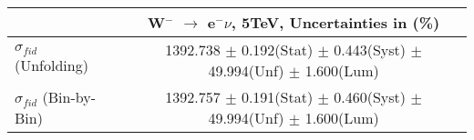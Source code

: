 \documentclass[12pt]{article}
\begin{document}
\begin{table}[ht]
\begin{tabular}{c|c|}
\cline{2-2}
                                                           &    W$^{-}$ $\rightarrow$ e$^{-} \nu $, 5TeV, Uncertainties in (\%)  \\ \hline 
\multicolumn{1}{|l|}{$\sigma_{fid}$ (Unfolding)}         &    1392.738   $\pm$ 0.192(Stat) $\pm$ 0.443(Syst) $\pm$ 49.994(Unf) $\pm$ 1.600(Lum)     \\ \hline 
\multicolumn{1}{|l|}{$\sigma_{fid}$ (Bin-by-Bin)}        &    1392.757   $\pm$ 0.191(Stat) $\pm$ 0.460(Syst) $\pm$ 49.994(Unf) $\pm$ 1.600(Lum)     \\ \hline 
\end{tabular}
\end{table}
\end{document}
